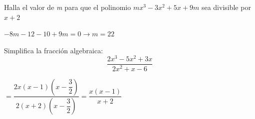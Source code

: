 \documentclass[addpoints,spanish, 12pt,a4paper]{exam}
\begin{document}
\begin{questions}



\addpoints



\question[1] Halla el valor de \emph{m} para que el polinomio $mx^3-3x^2+5x+9m$ sea divisible por $x+2$
\begin{solution}
    $-8m-12-10+9m=0 \to m=22$
\end{solution}



\addpoints

\question[2] Simplifica la fracción algebraica: $$\dfrac{2x^3-5x^2+3x}{2x^2+x-6} $$
\begin{solution}$=\dfrac{2x\left(x-1\right)\left(x-\dfrac{3}{2}\right)}{2\left(x+2\right)\left(x-\dfrac{3}{2}\right)}=\dfrac{x(x-1)}{x+2}$  \end{solution}



\end{questions}
\end{document}

